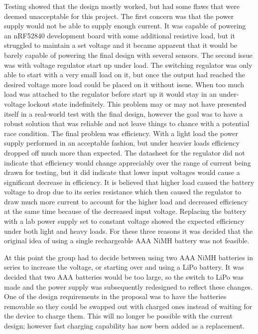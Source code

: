 Testing showed that the design mostly worked, but had some flaws that were 
deemed unacceptable for this project. The first concern was that the power 
supply would not be able to supply enough current. It was capable of powering 
an nRF52840 development board with some additional resistive load, but it 
struggled to maintain a set voltage and it became apparent that it would be 
barely capable of powering the final design with several sensors. The second 
issue was with voltage regulator start up under load. The switching regulator 
was only able to start with a very small load on it, but once the output had 
reached the desired voltage more load could be placed on it without issue. When 
too much load was attached to the regulator before start up it would stay in an 
under-voltage lockout state indefinitely. This problem may or may not have 
presented itself in a real-world test with the final design, however the goal 
was to have a robust solution that was reliable and not leave things to chance 
with a potential race condition. The final problem was efficiency. With a light 
load the power supply performed in an acceptable fashion, but under heavier 
loads efficiency dropped off much more than expected. The datasheet for the 
regulator did not indicate that efficiency would change appreciably over the 
range of current being drawn for testing, but it did indicate that lower input 
voltages would cause a significant decrease in efficiency. It is believed that 
higher load caused the battery voltage to drop due to its series resistance 
which then caused the regulator to draw much more current to account for the 
higher load and decreased efficiency at the same time because of the decreased 
input voltage. Replacing the battery with a lab power supply set to constant 
voltage showed the expected efficiency under both light and heavy loads. For 
these three reasons it was decided that the original idea of using a single 
rechargeable AAA NiMH battery was not feasible. 

At this point the group had to decide between using two AAA NiMH batteries in 
series to increase the voltage, or starting over and using a LiPo battery. It 
was decided that two AAA batteries would be too large, so the switch to LiPo 
was made and the power supply was subsequently redesigned to reflect these 
changes. One of the design requirements in the proposal was to have the 
batteries removable so they could be swapped out with charged ones instead of 
waiting for the device to charge them. This will no longer be possible with 
the current design; however fast charging capability has now been added as a 
replacement.

